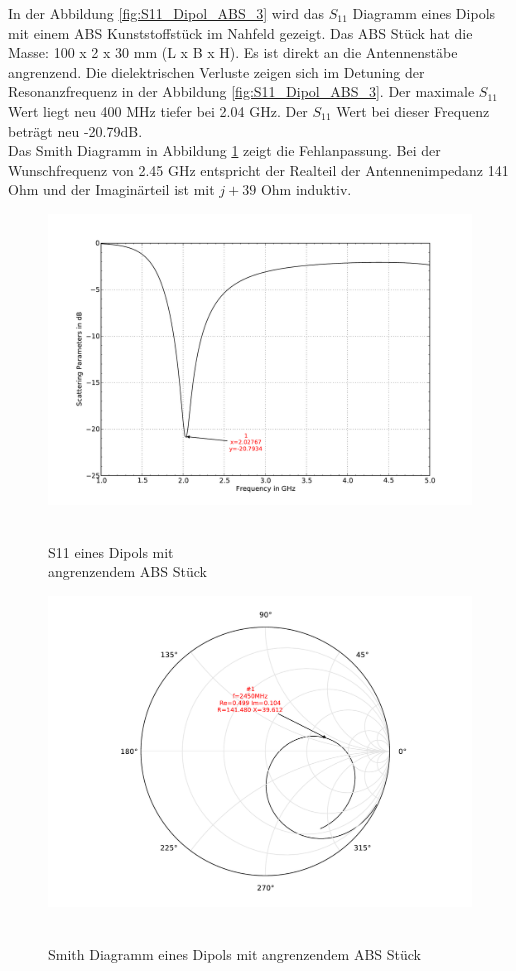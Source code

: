 In der Abbildung \ref{fig:S11_Dipol_ABS_3} wird das $S_{11}$ Diagramm eines Dipols mit einem ABS Kunststoffstück im Nahfeld gezeigt. Das ABS Stück hat die Masse: 100 x 2 x 30 mm (L x B x H). Es ist direkt an die Antennenstäbe angrenzend. Die dielektrischen Verluste zeigen sich im Detuning der Resonanzfrequenz in der Abbildung \ref{fig:S11_Dipol_ABS_3}. Der maximale $S_{11}$ Wert liegt neu 400 MHz tiefer bei 2.04 GHz. Der $S_{11}$ Wert bei dieser Frequenz beträgt  neu -20.79dB.\\
Das Smith Diagramm in Abbildung \ref{fig:Smith_Dipol_ABS_4} zeigt die Fehlanpassung. Bei der Wunschfrequenz von 2.45 GHz entspricht der Realteil der Antennenimpedanz 141 Ohm und der Imaginärteil ist mit $j+39$ Ohm induktiv.
\begin{figure}[!h]
\begin{center}
  \includegraphics[width=\linewidth]{content/bilder/Evaluation/Dipol/S11DipolABS.pdf}
  \caption{\\S11 eines Dipols mit \\angrenzendem ABS Stück}\label{fig:S11_Dipol_ABS_3}
\endminipage%
{}
  \includegraphics[width=\linewidth]{content/bilder/Evaluation/Dipol/SmithDipolABS.pdf}
  \caption{\\Smith Diagramm eines Dipols mit angrenzendem ABS Stück}\label{fig:Smith_Dipol_ABS_4}
\endminipage
\end{center}
\end{figure}

